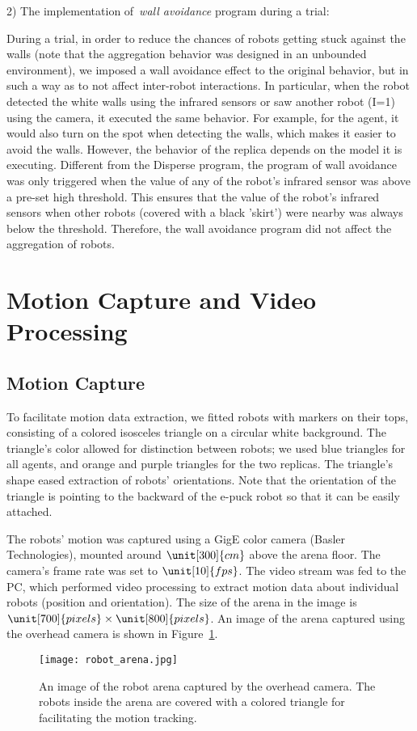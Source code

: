 2) The implementation of~\textit{wall avoidance} program during a trial:

During a trial, in order to reduce the chances of robots getting stuck against the walls (note that the aggregation behavior was designed in an unbounded environment), we imposed a wall avoidance effect to the original behavior, but in such a way as to not affect inter-robot interactions. In particular, when the robot detected the white walls using the infrared sensors or saw another robot (I=1) using the camera, it executed the same behavior. For example, for the agent, it would also turn on the spot when detecting the walls, which makes it easier to avoid the walls. However, the behavior of the replica depends on the model it is executing. Different from the Disperse program, the program of wall avoidance was only triggered when the value of any of the robot's infrared sensor was above a pre-set high threshold. This ensures that the value of the robot's infrared sensors when other robots (covered with a black 'skirt') were nearby was always below the threshold. Therefore, the wall avoidance program did not affect the aggregation of robots.

\section{Motion Capture and Video Processing}\label{motion_capture_and_video_processing_swarm_physical}

\subsection{Motion Capture}\label{sec:motion_capture_swarm_physical}

To facilitate motion data extraction, we fitted robots with markers on their tops, consisting of a colored isosceles triangle on a circular white background. The triangle's color allowed for distinction between robots; we used blue triangles for all agents, and orange and purple triangles for the two replicas. The triangle's shape eased extraction of robots' orientations. Note that the orientation of the triangle is pointing to the backward of the e-puck robot so that it can be easily attached.

The robots' motion was captured using a GigE color camera (Basler Technologies), mounted around $\unit[300]{cm}$ above the arena floor. The camera's frame rate was set to $\unit[10]{fps}$. The video stream was fed to the PC, which performed video processing to extract motion data about individual robots (position and orientation). The size of the arena in the image is $\unit[700]{pixels} \times \unit[800]{pixels}$. An image of the arena captured using the overhead camera is shown in Figure~\ref{fig:robot_arena}.
%
\begin{figure}[!t]
    \centering
    \texttt{[image: robot\_arena.jpg]}
    \caption{An image of the robot arena captured by the overhead camera. The robots inside the arena are covered with a colored triangle for facilitating the motion tracking.}
    \label{fig:robot_arena}
\end{figure} 
%
